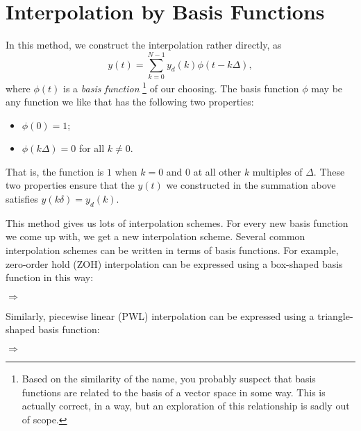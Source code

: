 \section{Interpolation by Basis Functions}

In this method, we construct the interpolation rather directly, as
\begin{equation*}
 y(t) = \sum_{k=0}^{N-1} y_d(k) \phi(t-k\Delta),
\end{equation*}
where $\phi(t)$ is a \emph{basis function}
\footnote{Based on the similarity of the name, you probably suspect that basis functions are related to the basis of a vector space in some way.
This is actually correct, in a way, but an exploration of this relationship is sadly out of scope.}
of our choosing.
The basis function $\phi$ may be any function we like that has the following two properties:
\begin{itemize}
 \item $\phi(0)=1$;
 \item $\phi(k\Delta)=0$ for all $k\ne 0$.
\end{itemize}
That is, the function is $1$ when $k=0$ and $0$ at all other $k$ multiples of $\Delta$.
These two properties ensure that the $y(t)$ we constructed in the summation above satisfies $y(k\delta)=y_d(k)$.

This method gives us lots of interpolation schemes.
For every new basis function we come up with, we get a new interpolation scheme.
Several common interpolation schemes can be written in terms of basis functions.
For example, zero-order hold (ZOH) interpolation can be expressed using a box-shaped basis function in this way:

\begin{center}
{\Huge $\Longrightarrow$}
\end{center}

Similarly, piecewise linear (PWL) interpolation can be expressed using a triangle-shaped basis function:

\begin{center}
{\Huge $\Longrightarrow$}
\end{center}


